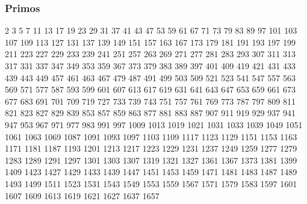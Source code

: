 \documentclass[10pt, landscape, twocolumn, a4paper, notitlepage]{article}
\begin{document}
\subsubsection{Primos}
2 3 5 7 11 13 17 19 23 29
31 37 41 43 47 53 59 61 67 71
73 79 83 89 97 101 103 107 109 113
127 131 137 139 149 151 157 163 167 173
179 181 191 193 197 199 211 223 227 229
233 239 241 251 257 263 269 271 277 281
283 293 307 311 313 317 331 337 347 349
353 359 367 373 379 383 389 397 401 409
419 421 431 433 439 443 449 457 461 463
467 479 487 491 499 503 509 521 523 541
547 557 563 569 571 577 587 593 599 601
607 613 617 619 631 641 643 647 653 659
661 673 677 683 691 701 709 719 727 733
739 743 751 757 761 769 773 787 797 809
811 821 823 827 829 839 853 857 859 863
877 881 883 887 907 911 919 929 937 941
947 953 967 971 977 983 991 997 1009 1013
1019 1021 1031 1033 1039 1049 1051 1061 1063 1069
1087 1091 1093 1097 1103 1109 1117 1123 1129 1151
1153 1163 1171 1181 1187 1193 1201 1213 1217 1223
1229 1231 1237 1249 1259 1277 1279 1283 1289 1291
1297 1301 1303 1307 1319 1321 1327 1361 1367 1373
1381 1399 1409 1423 1427 1429 1433 1439 1447 1451
1453 1459 1471 1481 1483 1487 1489 1493 1499 1511
1523 1531 1543 1549 1553 1559 1567 1571 1579 1583
1597 1601 1607 1609 1613 1619 1621 1627 1637 1657
\end{document}
